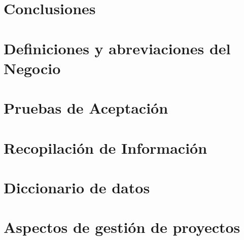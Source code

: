 \documentclass[final,letterpaper,oneside,authoryear,11pt,singlespace,spanish]{ezthesis}
\begin{document}
\chapter{Conclusiones} 
\label{cap:conclusion}



% 


\appendix

\chapter{Definiciones y abreviaciones del Negocio}
\label{anexo:glosario}


\chapter{Pruebas de Aceptación}
\label{anexo:pruebasaceptacion}


\chapter{Recopilación de Información}  
\label{anexo:recopilacion}


\chapter{Diccionario de datos}
\label{anexo:diccionario}


\chapter{Aspectos de gestión de proyectos}
\label{anexo:gestion}



\end{document}
